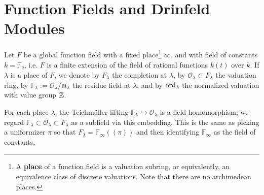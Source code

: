 \documentclass{article}
\newcommand{\F}{\mathbb{F}}
\renewcommand{\O}{\mathcal{O}}
\newcommand{\m}{\mathfrak{m}}
\newcommand{\llpar}{(\!(}
\newcommand{\rrpar}{)\!)}
\newcommand{\ab}{\mathrm{ab}}
\begin{document}



\section{Function Fields and Drinfeld Modules}
Let $F$ be a global function field with a fixed place\footnote{
    A \textbf{place} of a function field is a valuation subring, or equivalently, an equivalence class of discrete valuations.
    Note that there are no archimedean places.
} $\infty$, and with field of constants $k = \F_q$,
i.e.\! $F$ is a finite extension of the field of rational functions $k(t)$ over $k$.
If $\lambda$ is a place of $F$,
we denote by $F_\lambda$ the completion at $\lambda$,  by $\O_\lambda\subset F_\lambda$ the valuation ring,
by $\F_\lambda := \O_\lambda/\m_\lambda$ the residue field at $\lambda$, and by $\operatorname{ord}_\lambda$ the normalized valuation with value group $\mathbb{Z}$.

For each place $\lambda$, the Teichm\"uller lifting $\F_\lambda\hookrightarrow \O_\lambda$ is a field homomorphism;
we regard $\F_\lambda\subset\O_\lambda\subset F_\lambda$ as a subfield via this embedding.
This is the same as picking a uniformizer $\pi$ so that $F_\lambda = \F_\infty\llpar \pi\rrpar$ and then identifying $\F_\infty$ as the field of constants.
\end{document}
